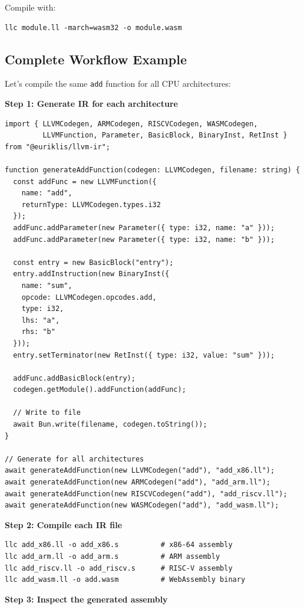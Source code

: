 \documentclass[11pt]{article}
\begin{document}
Compile with:
\begin{lstlisting}[style=ts]
llc module.ll -march=wasm32 -o module.wasm
\end{lstlisting}

\subsection{Complete Workflow Example}

Let's compile the same \texttt{add} function for all CPU architectures:

\textbf{Step 1: Generate IR for each architecture}
\begin{lstlisting}[style=ts]
import { LLVMCodegen, ARMCodegen, RISCVCodegen, WASMCodegen,
         LLVMFunction, Parameter, BasicBlock, BinaryInst, RetInst } from "@euriklis/llvm-ir";

function generateAddFunction(codegen: LLVMCodegen, filename: string) {
  const addFunc = new LLVMFunction({
    name: "add",
    returnType: LLVMCodegen.types.i32
  });
  addFunc.addParameter(new Parameter({ type: i32, name: "a" }));
  addFunc.addParameter(new Parameter({ type: i32, name: "b" }));

  const entry = new BasicBlock("entry");
  entry.addInstruction(new BinaryInst({
    name: "sum",
    opcode: LLVMCodegen.opcodes.add,
    type: i32,
    lhs: "a",
    rhs: "b"
  }));
  entry.setTerminator(new RetInst({ type: i32, value: "sum" }));

  addFunc.addBasicBlock(entry);
  codegen.getModule().addFunction(addFunc);

  // Write to file
  await Bun.write(filename, codegen.toString());
}

// Generate for all architectures
await generateAddFunction(new LLVMCodegen("add"), "add_x86.ll");
await generateAddFunction(new ARMCodegen("add"), "add_arm.ll");
await generateAddFunction(new RISCVCodegen("add"), "add_riscv.ll");
await generateAddFunction(new WASMCodegen("add"), "add_wasm.ll");
\end{lstlisting}

\textbf{Step 2: Compile each IR file}
\begin{lstlisting}[style=ts]
llc add_x86.ll -o add_x86.s          # x86-64 assembly
llc add_arm.ll -o add_arm.s          # ARM assembly
llc add_riscv.ll -o add_riscv.s      # RISC-V assembly
llc add_wasm.ll -o add.wasm          # WebAssembly binary
\end{lstlisting}

\textbf{Step 3: Inspect the generated assembly}
\end{document}
